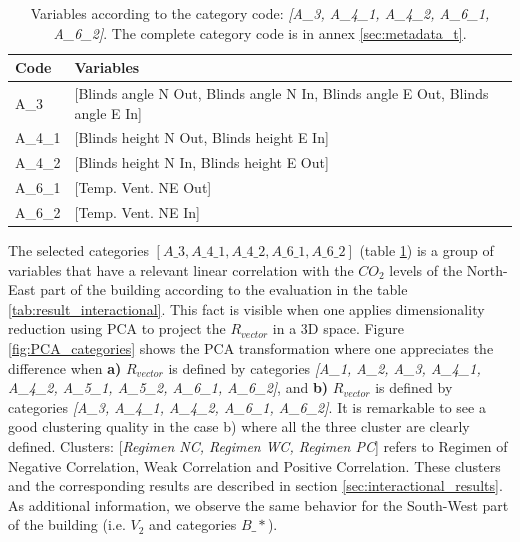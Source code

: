 \begin{table}[]
\centering
\scriptsize
\caption{Variables according to the category code:  \textit{[A\_3, A\_{4\_1}, A\_{4\_2},  A\_{6\_1}, A\_{6\_2}]}. The complete category code is in annex \ref{sec:metadata_t}.}
\label{code_cat}
\begin{tabular}{|l|l|}
\hline
Code    & Variables                                                                          \\ \hline
A\_3    & {[}Blinds angle N Out, Blinds angle N In, Blinds angle E Out, Blinds angle E In{]} \\ \hline
A\_4\_1 & {[}Blinds height N Out, Blinds height E In{]}                                      \\ \hline
A\_4\_2 & {[}Blinds height N In, Blinds height E Out{]}                                      \\ \hline
A\_6\_1 & {[}Temp. Vent. NE Out{]}                                                           \\ \hline
A\_6\_2 & {[}Temp. Vent. NE In{]}                                                            \\ \hline
\end{tabular}
\end{table}

The selected categories $[A\_3, A\_{4\_1}, A\_{4\_2},  A\_{6\_1}, A\_{6\_2}]$ (table \ref{code_cat}) is a group of variables that have a relevant linear correlation with the $CO_2$ levels of the North-East part of the building according to the evaluation in the table \ref{tab:result_interactional}. This fact is visible when one applies dimensionality reduction using PCA to project the $R_{vector}$ in a 3D space. Figure \ref{fig:PCA_categories} shows the PCA transformation where one appreciates the difference when \textbf{a)} $R_{vector}$ is defined by categories \textit{[A\_1, A\_2, A\_3, A\_4\_1, A\_4\_2, A\_5\_1, A\_5\_2, A\_6\_1, A\_6\_2]}, and \textbf{b)} $R_{vector}$ is defined by categories \textit{[A\_3, A\_{4\_1}, A\_{4\_2},  A\_{6\_1}, A\_{6\_2}]}. It is remarkable to see a good clustering quality in the case b) where all the three cluster are clearly defined. Clusters: [\textit{Regimen NC, Regimen WC, Regimen PC}] refers to Regimen of Negative Correlation, Weak Correlation and Positive Correlation. These clusters and the corresponding results are described in section \ref{sec:interactional_results}. As additional information, we observe the same behavior for the South-West part of the building (i.e. $V_2$ and categories $B\_*$). 

